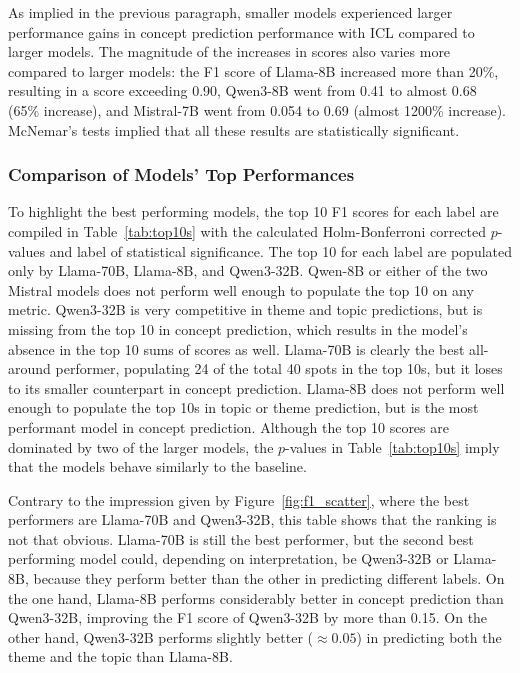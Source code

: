 \documentclass[english, 12pt, a4paper, sci, utf8, a-2b, online]{latex/definitions/aaltothesis}
\begin{document}
As implied in the previous paragraph, smaller models experienced larger performance gains in concept prediction performance with ICL compared to larger models. The magnitude of the increases in scores also varies more compared to larger models: the F1 score of Llama-8B increased more than 20\%, resulting in a score exceeding 0.90, Qwen3-8B went from 0.41 to almost 0.68 (65\% increase), and Mistral-7B went from 0.054 to 0.69 (almost 1200\% increase). McNemar's tests implied that all these results are statistically significant.

\subsubsection{Comparison of Models' Top Performances}





To highlight the best performing models, the top 10 F1 scores for each label are compiled in Table~\ref{tab:top10s} with the calculated Holm-Bonferroni corrected $p$-values and label of statistical significance. The top 10 for each label are populated only by Llama-70B, Llama-8B, and Qwen3-32B. Qwen-8B or either of the two Mistral models does not perform well enough to populate the top 10 on any metric. Qwen3-32B is very competitive in theme and topic predictions, but is missing from the top 10 in concept prediction, which results in the model's absence in the top 10 sums of scores as well. Llama-70B is clearly the best all-around performer, populating 24 of the total 40 spots in the top 10s, but it loses to its smaller counterpart in concept prediction. Llama-8B does not perform well enough to populate the top 10s in topic or theme prediction, but is the most performant model in concept prediction. Although the top 10 scores are dominated by two of the larger models, the $p$-values in Table~\ref{tab:top10s} imply that the models behave similarly to the baseline. 

Contrary to the impression given by Figure~\ref{fig:f1_scatter}, where the best performers are Llama-70B and Qwen3-32B, this table shows that the ranking is not that obvious. Llama-70B is still the best performer, but the second best performing model could, depending on interpretation, be Qwen3-32B or Llama-8B, because they perform better than the other in predicting different labels. On the one hand, Llama-8B performs considerably better in concept prediction than Qwen3-32B, improving the F1 score of Qwen3-32B by more than 0.15. On the other hand, Qwen3-32B performs slightly better ($\approx 0.05$) in predicting both the theme and the topic than Llama-8B.
\end{document}
